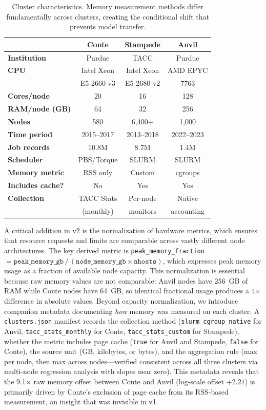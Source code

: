 \documentclass[sigconf]{acmart}
\begin{document}
\begin{table}[t]
\caption{Cluster characteristics. Memory measurement methods differ fundamentally across clusters, creating the conditional shift that prevents model transfer.}
\label{tab:clusters}
\centering
\small
\begin{tabular}{@{}lccc@{}}
\toprule
 & \textbf{Conte} & \textbf{Stampede} & \textbf{Anvil} \\
\midrule
\textbf{Institution} & Purdue & TACC & Purdue \\
\textbf{CPU} & Intel Xeon & Intel Xeon & AMD EPYC \\
 & E5-2660 v3 & E5-2680 v2 & 7763 \\
\textbf{Cores/node} & 20 & 16 & 128 \\
\textbf{RAM/node (GB)} & 64 & 32 & 256 \\
\textbf{Nodes} & 580 & 6,400+ & 1,000 \\
\textbf{Time period} & 2015--2017 & 2013--2018 & 2022--2023 \\
\textbf{Job records} & 10.8M & 8.7M & 1.4M \\
\textbf{Scheduler} & PBS/Torque & SLURM & SLURM \\
\textbf{Memory metric} & RSS only & Custom & cgroups \\
\textbf{Includes cache?} & No & Yes & Yes \\
\textbf{Collection} & TACC Stats & Per-node & Native \\
 & (monthly) & monitors & accounting \\
\bottomrule
\end{tabular}
\end{table}

A critical addition in v2 is the normalization of hardware metrics, which ensures that resource requests and limits are comparable across vastly different node architectures.
The key derived metric is \texttt{peak\_memory\_fraction}~$= \texttt{peak\_memory\_gb} \,/\, (\texttt{node\_memory\_gb} \times \texttt{nhosts})$, which expresses peak memory usage as a fraction of available node capacity.
This normalization is essential because raw memory values are not comparable: Anvil nodes have 256~GB of RAM while Conte nodes have 64~GB, so identical fractional usage produces a 4$\times$ difference in absolute values.
Beyond capacity normalization, we introduce companion metadata documenting \emph{how} memory was measured on each cluster.
A \texttt{clusters.json} manifest records the collection method (\texttt{slurm\_cgroup\_native} for Anvil, \texttt{tacc\_stats\_monthly} for Conte, \texttt{tacc\_stats\_custom} for Stampede), whether the metric includes page cache (\texttt{true} for Anvil and Stampede, \texttt{false} for Conte), the source unit (GB, kilobytes, or bytes), and the aggregation rule (max per node, then max across nodes---verified consistent across all three clusters via multi-node regression analysis with slopes near zero).
This metadata reveals that the 9.1$\times$ raw memory offset between Conte and Anvil (log-scale offset $+2.21$) is primarily driven by Conte's exclusion of page cache from its RSS-based measurement, an insight that was invisible in v1.
\end{document}

